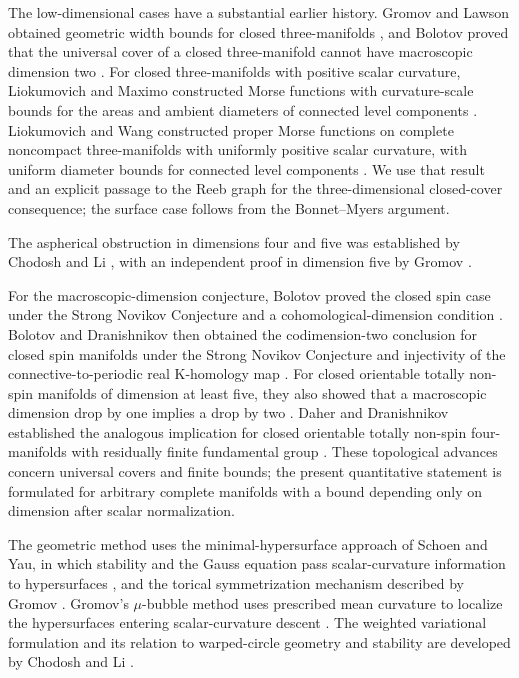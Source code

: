 \documentclass[11pt]{article}
\numberwithin{equation}{section}
\theoremstyle{definition}
\theoremstyle{remark}
\begin{document}
The low-dimensional cases have a substantial earlier history.
Gromov and Lawson obtained geometric width bounds for closed three-manifolds
\citep[Corollary~10.11]{gromovLawson1983}, and Bolotov proved that the
universal cover of a closed three-manifold cannot have macroscopic
dimension two \citep{bolotov2003}.
For closed three-manifolds with positive scalar curvature, Liokumovich
and Maximo constructed Morse functions with curvature-scale bounds for
the areas and ambient diameters of connected level components
\citep[Theorem~1.1]{liokumovichMaximo2023}.
Liokumovich and Wang constructed proper Morse functions on
complete noncompact three-manifolds with uniformly positive scalar
curvature, with uniform diameter bounds for connected level components
\citep[Theorem~1.1]{liokumovichWang2023}.
We use that result and an explicit passage to the Reeb graph for the
three-dimensional closed-cover consequence; the surface case follows
from the Bonnet--Myers argument.

The aspherical obstruction in dimensions four and five was established
by Chodosh and Li \citep[Theorem~2]{chodoshLi}, with an independent
proof in dimension five by Gromov
\citep[\S7, Main Corollary]{gromov2020Aspherical}.

For the macroscopic-dimension conjecture, Bolotov proved the closed spin
case under the Strong Novikov Conjecture and a cohomological-dimension condition
\citep{bolotov2009}. Bolotov and Dranishnikov then obtained the
codimension-two conclusion for closed spin manifolds under the
Strong Novikov Conjecture and
injectivity of the connective-to-periodic real K-homology map
\citep[Theorem~4.3]{bolotovDranishnikov2010}.
For closed orientable totally non-spin manifolds of dimension at least
five, they also showed that a macroscopic dimension drop by one implies
a drop by two \citep[Theorem~3.4]{bolotovDranishnikov2016}.
Daher and Dranishnikov established the analogous implication for closed
orientable totally non-spin four-manifolds with residually finite
fundamental group
\citep[Theorem~3.3]{daherDranishnikov2019}.
These topological advances concern universal covers and finite bounds;
the present quantitative statement is formulated for arbitrary complete
manifolds with a bound depending only on dimension after scalar normalization.


The geometric method uses the minimal-hypersurface approach of Schoen
and Yau, in which stability and the Gauss equation pass scalar-curvature
information to hypersurfaces \citep[Section~1]{schoenYau1979Structure},
and the torical symmetrization mechanism described by Gromov
\citep[Section~2]{gromov2018Metric}. Gromov's \(\mu\)-bubble method
uses prescribed mean curvature to localize the hypersurfaces entering
scalar-curvature descent \citep[\S\(5\frac56\)]{gromov1996}.
The weighted variational formulation and its relation to warped-circle
geometry and stability are developed by Chodosh and Li
\citep[Section~3 and Remark~11]{chodoshLi}.
\end{document}
